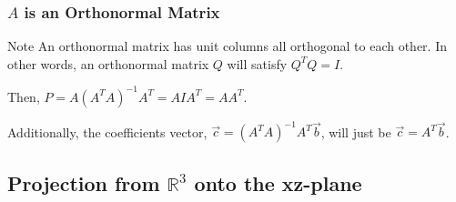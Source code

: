 \documentclass[12pt]{beamer}
\begin{document}
\begin{frame}
    \frametitle{$A$ is an Orthonormal Matrix}

    \begin{block}{Note}
        An orthonormal matrix has unit columns all orthogonal to each other.
        In other words, an orthonormal matrix $Q$ will satisfy $Q^T Q = I$.
    \end{block}

    \pause

    Then, $P=A(A^T A)^{-1} A^T= A I A^T = A A^T$.

    \pause

    Additionally, the coefficients vector, $\vec{c} = (A^T A)^{-1} A^T \vec{b}$, will just be $\vec{c} = A^T \vec{b}$.
\end{frame}

\subsection{Projection from $\mathbb{R}^3$ onto the xz-plane}
\end{document}
